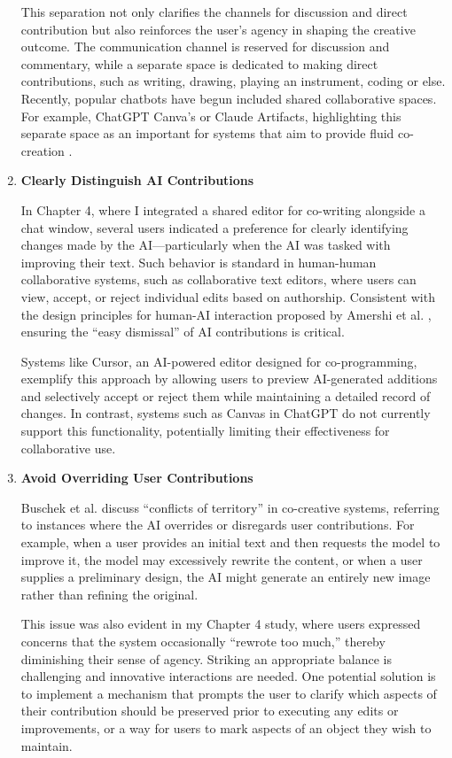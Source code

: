 \begin{enumerate}
This separation not only clarifies the channels for discussion and direct contribution but also reinforces the user’s agency in shaping the creative outcome. The communication channel is reserved for discussion and commentary, while a separate space is dedicated to making direct contributions, such as writing, drawing, playing an instrument, coding or else. Recently, popular chatbots have begun included shared collaborative spaces. For example, ChatGPT Canva's or Claude Artifacts, highlighting this separate space as an important for systems that aim to provide fluid co-creation \cite{Anthropic2024-dl, OpenAI2024-ug}. 

\item \textbf{Clearly Distinguish AI Contributions}

In Chapter 4, where I integrated a shared editor for co-writing alongside a chat window, several users indicated a preference for clearly identifying changes made by the AI—particularly when the AI was tasked with improving their text. Such behavior is standard in human-human collaborative systems, such as collaborative text editors, where users can view, accept, or reject individual edits based on authorship. Consistent with the design principles for human-AI interaction proposed by Amershi et al. \cite{Amershi2019-vy}, ensuring the “easy dismissal” of AI contributions is critical.

Systems like Cursor, an AI-powered editor designed for co-programming, exemplify this approach by allowing users to preview AI-generated additions and selectively accept or reject them while maintaining a detailed record of changes. In contrast, systems such as Canvas in ChatGPT do not currently support this functionality, potentially limiting their effectiveness for collaborative use.

\item \textbf{Avoid Overriding User Contributions}

Buschek et al. \cite{Buschek2021-ks} discuss “conflicts of territory” in co-creative systems, referring to instances where the AI overrides or disregards user contributions. For example, when a user provides an initial text and then requests the model to improve it, the model may excessively rewrite the content, or when a user supplies a preliminary design, the AI might generate an entirely new image rather than refining the original.

This issue was also evident in my Chapter 4 study, where users expressed concerns that the system occasionally “rewrote too much,” thereby diminishing their sense of agency. Striking an appropriate balance is challenging and innovative interactions are needed. One potential solution is to implement a mechanism that prompts the user to clarify which aspects of their contribution should be preserved prior to executing any edits or improvements, or a way for users to mark aspects of an object they wish to maintain. 

\end{enumerate}


